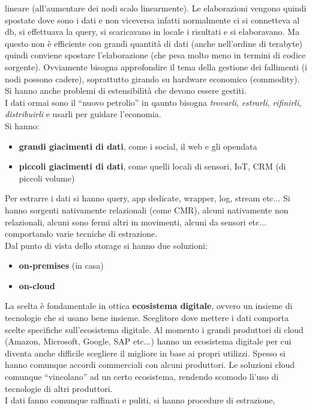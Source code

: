 \documentclass[a4paper,12pt, oneside]{book}
\begin{document}
lineare (all'aumentare dei nodi scalo linearmente). Le elaborazioni vengono
quindi spostate dove sono i dati e non viceversa infatti normalmente ci si
connetteva al db, si effettuava la query, si scaricavano in locale i risultati e
si elaboravano. Ma questo non è efficiente con grandi quantità di dati (anche
nell'ordine di terabyte) quindi conviene spostare l'elaborazione (che pesa molto
meno in termini di codice sorgente). Ovviamente bisogna approfondire il tema
della gestione dei fallimenti (i nodi possono cadere), soprattutto girando su
hardware economico (commodity). Si hanno anche problemi di estensibilità che
devono essere gestiti.\\
I dati ormai sono il ``nuovo petrolio'' in qaunto bisogna \textit{trovarli},
\textit{estrarli}, \textit{rifinirli}, \textit{distribuirli} e usarli per
guidare l'economia.\\
Si hanno:
\begin{itemize}
  \item \textbf{grandi giacimenti di dati}, come i social, il web e gli opendata
  \item \textbf{piccoli giacimenti di dati}, come quelli locali di sensori, IoT,
  CRM (di piccoli volume)
\end{itemize}
Per estrarre i dati si hanno query, app dedicate, wrapper, log, stream
etc$\ldots$ Si hanno sorgenti nativamente relazionali (come CMR), alcuni
nativamente non relazionali, alcuni sono fermi altri in movimenti, alcuni da
sensori etc$\ldots$ comportando varie tecniche di estrazione.\\
Dal punto di vista dello storage si hanno due soluzioni:
\begin{itemize}
  \item \textbf{on-premises} (in casa)
  \item \textbf{on-cloud}
\end{itemize}
La scelta è fondamentale in ottica \textbf{ecosistema digitale}, ovvero un
insieme di tecnologie che si usano bene insieme. Sceglitore dove mettere i dati
comporta scelte specifiche sull'ecosistema digitale. Al momento i grandi
produttori di cloud (Amazon, Microsoft, Google, SAP etc$\ldots$) hanno un
ecosistema digitale per cui diventa anche difficile scegliere il migliore in
base ai propri utilizzi. Spesso si hanno comunque accordi commerciali con alcuni
produttori. Le soluzioni cloud comunque ``vincolano'' ad un certo ecosistema,
rendendo scomodo lì'uso di tecnologie di altri produttori.\\
I dati fanno comunque raffinati e puliti, si hanno procedure di estrazione,
\end{document}
